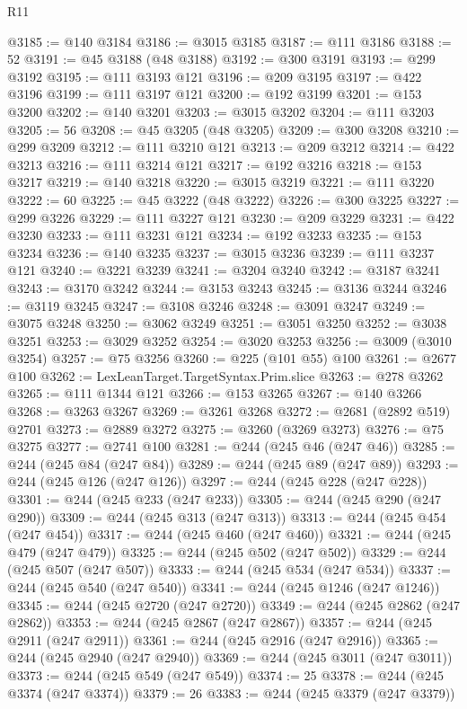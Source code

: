 \begin{lexlean}{R11}
\begin{coremodule}
@3185 := @140 @3184
@3186 := @3015 @3185
@3187 := @111 @3186
@3188 := 52
@3191 := @45 @3188 (@48 @3188)
@3192 := @300 @3191
@3193 := @299 @3192
@3195 := @111 @3193 @121
@3196 := @209 @3195
@3197 := @422 @3196
@3199 := @111 @3197 @121
@3200 := @192 @3199
@3201 := @153 @3200
@3202 := @140 @3201
@3203 := @3015 @3202
@3204 := @111 @3203
@3205 := 56
@3208 := @45 @3205 (@48 @3205)
@3209 := @300 @3208
@3210 := @299 @3209
@3212 := @111 @3210 @121
@3213 := @209 @3212
@3214 := @422 @3213
@3216 := @111 @3214 @121
@3217 := @192 @3216
@3218 := @153 @3217
@3219 := @140 @3218
@3220 := @3015 @3219
@3221 := @111 @3220
@3222 := 60
@3225 := @45 @3222 (@48 @3222)
@3226 := @300 @3225
@3227 := @299 @3226
@3229 := @111 @3227 @121
@3230 := @209 @3229
@3231 := @422 @3230
@3233 := @111 @3231 @121
@3234 := @192 @3233
@3235 := @153 @3234
@3236 := @140 @3235
@3237 := @3015 @3236
@3239 := @111 @3237 @121
@3240 := @3221 @3239
@3241 := @3204 @3240
@3242 := @3187 @3241
@3243 := @3170 @3242
@3244 := @3153 @3243
@3245 := @3136 @3244
@3246 := @3119 @3245
@3247 := @3108 @3246
@3248 := @3091 @3247
@3249 := @3075 @3248
@3250 := @3062 @3249
@3251 := @3051 @3250
@3252 := @3038 @3251
@3253 := @3029 @3252
@3254 := @3020 @3253
@3256 := @3009 (@3010 @3254)
@3257 := @75 @3256
@3260 := @225 (@101 @55) @100
@3261 := @2677 @100
@3262 := LexLeanTarget.TargetSyntax.Prim.slice
@3263 := @278 @3262
@3265 := @111 @1344 @121
@3266 := @153 @3265
@3267 := @140 @3266
@3268 := @3263 @3267
@3269 := @3261 @3268
@3272 := @2681 (@2892 @519) @2701
@3273 := @2889 @3272
@3275 := @3260 (@3269 @3273)
@3276 := @75 @3275
@3277 := @2741 @100
@3281 := @244 (@245 @46 (@247 @46))
@3285 := @244 (@245 @84 (@247 @84))
@3289 := @244 (@245 @89 (@247 @89))
@3293 := @244 (@245 @126 (@247 @126))
@3297 := @244 (@245 @228 (@247 @228))
@3301 := @244 (@245 @233 (@247 @233))
@3305 := @244 (@245 @290 (@247 @290))
@3309 := @244 (@245 @313 (@247 @313))
@3313 := @244 (@245 @454 (@247 @454))
@3317 := @244 (@245 @460 (@247 @460))
@3321 := @244 (@245 @479 (@247 @479))
@3325 := @244 (@245 @502 (@247 @502))
@3329 := @244 (@245 @507 (@247 @507))
@3333 := @244 (@245 @534 (@247 @534))
@3337 := @244 (@245 @540 (@247 @540))
@3341 := @244 (@245 @1246 (@247 @1246))
@3345 := @244 (@245 @2720 (@247 @2720))
@3349 := @244 (@245 @2862 (@247 @2862))
@3353 := @244 (@245 @2867 (@247 @2867))
@3357 := @244 (@245 @2911 (@247 @2911))
@3361 := @244 (@245 @2916 (@247 @2916))
@3365 := @244 (@245 @2940 (@247 @2940))
@3369 := @244 (@245 @3011 (@247 @3011))
@3373 := @244 (@245 @549 (@247 @549))
@3374 := 25
@3378 := @244 (@245 @3374 (@247 @3374))
@3379 := 26
@3383 := @244 (@245 @3379 (@247 @3379))

\end{coremodule}
\end{lexlean}
